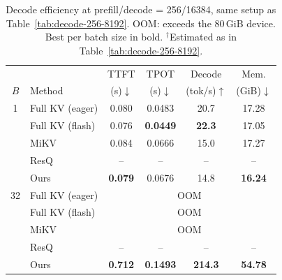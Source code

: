 \begin{table}[t]
\centering
\small
\setlength{\tabcolsep}{2.5pt}
\begin{tabular}{@{}cl cccc@{}}
\toprule
 &        & TTFT & TPOT & Decode & Mem. \\
$B$ & Method & (s)$\downarrow$ & (s)$\downarrow$ & (tok/s)$\uparrow$ & (GiB)$\downarrow$ \\
\midrule
 1 & Full KV (eager) & 0.080\rlap{$^\dagger$} &          0.0483  &          20.7   &          17.28  \\ %
   & Full KV (flash) & 0.076\rlap{$^\dagger$} & \textbf{0.0449}  & \textbf{22.3}   &          17.05  \\ %
   & MiKV            &          0.084 &          0.0666  &          15.0   &          17.27  \\
   & ResQ            &          --    &            --    &            --   &            --   \\ %
   & Ours            & \textbf{0.079} &          0.0676  &          14.8   & \textbf{16.24}  \\
\midrule
32 & Full KV (eager) & \multicolumn{4}{c}{OOM} \\
   & Full KV (flash) & \multicolumn{4}{c}{OOM} \\
   & MiKV            & \multicolumn{4}{c}{OOM} \\
   & ResQ            &          --    &            --    &            --   &            --   \\ %
   & Ours            & \textbf{0.712} & \textbf{0.1493}  & \textbf{214.3}  & \textbf{54.78}  \\
\bottomrule
\end{tabular}
\caption{Decode efficiency at prefill/decode = 256/16384, same setup as
Table~\ref{tab:decode-256-8192}. OOM: exceeds the 80\,GiB device. Best per
batch size in bold. $^\dagger$Estimated as in Table~\ref{tab:decode-256-8192}.}
\label{tab:decode-256-16384}
\end{table}
